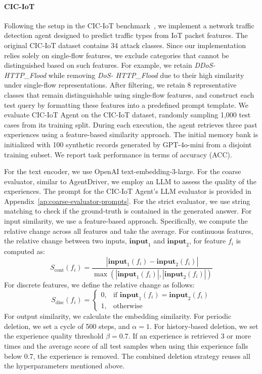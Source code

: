 \documentclass[11pt]{article}
\theoremstyle{plain}
\theoremstyle{definition}
\begin{document}
{\paragraph{CIC-IoT}
Following the setup in the CIC-IoT benchmark~\cite{ciciot}, we implement a network traffic detection agent designed to predict traffic types from IoT packet features. The original CIC-IoT dataset contains 34 attack classes. Since our implementation relies solely on single-flow features, we exclude categories that cannot be distinguished based on such features. For example, we retain \textit{DDoS-
HTTP\_Flood} while removing \textit{DoS-
HTTP\_Flood} due to their high similarity under single-flow representations. After filtering, we retain 8 representative classes that remain distinguishable using single-flow features, and construct each test query by formatting these features into a predefined prompt template. We evaluate CIC-IoT Agent on the CIC-IoT dataset, randomly sampling 1,000 test cases from its training split. During each execution, the agent retrieves three past experiences using a feature-based similarity approach. The initial memory bank is initialized with 100 synthetic records generated by GPT-4o-mini from a disjoint training subset. We report task performance in terms of accuracy (ACC).

For the text encoder, we use OpenAI text-embedding-3-large.
For the coarse evaluator, similar to AgentDriver, we employ an LLM to assess the quality of the experiences. The prompt for the CIC-IoT Agent's LLM evaluator is provided in Appendix~\ref{ap:coarse-evaluator-prompts}.
For the strict evaluator, we use string matching to check if the ground-truth is contained in the generated answer. For input similarity, we use a feature-based approach. Specifically, we compute the relative change across all features and take the average.  
For continuous features, the relative change between two inputs, $\mathbf{input}_1$ and $\mathbf{input}_2$, for feature $f_i$ is computed as:
\[
    S_{\text{cont}}(f_i) = \frac{| \mathbf{input}_1(f_i) - \mathbf{input}_2(f_i) |}{\max(|\mathbf{input}_1(f_i)|, |\mathbf{input}_2(f_i)|)}
\]
For discrete features, we define the relative change as follows:
\[
    S_{\text{disc}}(f_i) =
    \begin{cases}
        0, & \text{if } \mathbf{input}_1(f_i) = \mathbf{input}_2(f_i) \\
        1, & \text{otherwise}
    \end{cases}
\]
For output similarity, we calculate the embedding similarity. For periodic deletion, we set a cycle of 500 steps, and $\alpha =1$.
For history-based deletion, we set the experience quality threshold $\beta=0.7$. If an experience is retrieved 3 or more times and the average score of all test samples when using this experience falls below 0.7, the experience is removed. The combined deletion strategy reuses all the hyperparameters mentioned above.
}
\end{document}
